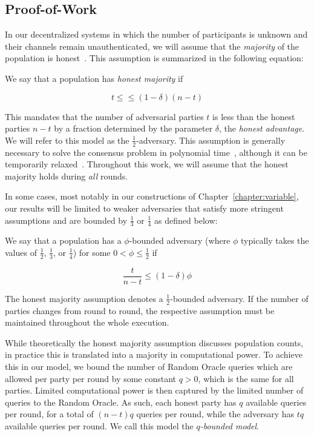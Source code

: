 \subsection{Proof-of-Work}
\cite{pow}
In our decentralized systems in which the number of participants is unknown and
their channels remain unauthenticated, we will assume that the \emph{majority}
of the population is honest~\cite{backbone}. This assumption is summarized in
the following equation:

\begin{definition}\index{$\delta$}
  We say that a population has \emph{honest majority} if

  \[
  t \leq \leq (1 - \delta)(n - t)
  \]
\end{definition}

This mandates that the number of adversarial parties $t$ is less than the honest
parties $n - t$ by a fraction determined by the parameter $\delta$, the
\emph{honest advantage}. We will refer to
this model as the $\frac{1}{2}$-adversary. This assumption is generally
necessary to solve the consensus problem in polynomial time~\cite{okun},
although it can be temporarily relaxed~\cite{dishonest}. Throughout this
work, we will assume that the honest majority holds during \emph{all} rounds.

In some cases, most notably in our constructions of
Chapter~\ref{chapter:variable}, our results will be limited to weaker
adversaries that satisfy more stringent assumptions and are bounded by
$\frac{1}{3}$ or $\frac{1}{4}$ as defined below:

\begin{definition}
  We say that a population has a $\phi$-bounded adversary (where $\phi$
  typically takes the values of $\frac{1}{2}$, $\frac{1}{3}$, or $\frac{1}{4}$)
  for some $0 < \phi \leq \frac{1}{2}$ if

  \[
  \frac{t}{n - t} \leq (1 - \delta)\phi
  \]
\end{definition}

The honest majority assumption denotes a $\frac{1}{2}$-bounded adversary. If the
number of parties changes from round to round, the respective assumption must be
maintained throughout the whole execution.

While theoretically the honest majority assumption discusses population counts,
in practice this is translated into a majority in computational power. To
achieve this in our model, we bound the number of Random Oracle queries which
are allowed per party per round by some constant $q > 0$, which is the same for all
parties. Limited computational power is then captured by the limited number of
queries to the Random Oracle. As such, each honest party has $q$ available
queries per round, for a total of $(n - t)q$ queries per round, while the
adversary has $tq$ available queries per round. We call this model the
\emph{$q$-bounded model}.

